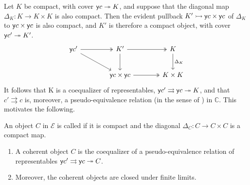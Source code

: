 \documentclass[a4paper,11pt]{amsart}
\newcommand{\covers}{\twoheadrightarrow}
\newcommand{\Cc}{\mathbb{C}}
\newcommand{\EE}{\mathcal{E}}
\begin{document}
Let $K$ be compact, with cover $\yo c \covers K$, and suppose that the diagonal map $\Delta_K:K\to K\times K$ is also compact.  Then the evident pullback $K' \rightarrowtail \mathsf{y} c \times \mathsf{y} c$ of $\Delta_K$ to $\mathsf{y} c \times \mathsf{y} c$ is also compact, and $K'$ is therefore a compact object, with cover $\yo c' \covers K'$.
\[\begin{tikzcd}[column sep=9ex,row sep=5ex]
		\yo c' \ar[rd] \ar[r,twoheadrightarrow] & K'	\ar[d] \ar[r,twoheadrightarrow]	&	K \ar[d,"\Delta_K"]
		\\
		&\yo c \times \yo c	\ar[r,twoheadrightarrow]	&	K \times K
	\end{tikzcd}\]
 It follows that K is a coequalizer of representables, $\yo c' \rightrightarrows \yo c \covers K$, and that $c' \rightrightarrows c$ is, moreover, a pseudo-equivalence relation (in the sense of \cite{Carboni}) in $\Cc$.  This motivates the following.

\begin{defn} An object  $C$ in $\EE$ is called  if it is compact and the diagonal $\Delta_C \colon C\to C\times C$ is a compact map.
\end{defn}

\begin{lem}\label{lem:coherent-cartesian}
	\begin{enumerate} \item A coherent object $C$ is the coequalizer of a pseudo-equivalence relation of representables $\yo c' \rightrightarrows \yo c \covers C$.  \item Moreover, the coherent objects are closed under finite limits.\end{enumerate}
\end{lem}
\end{document}
